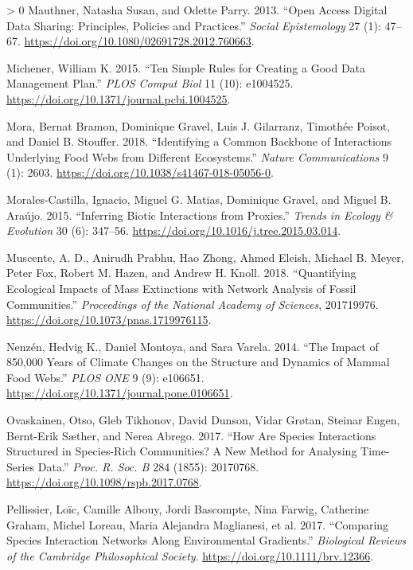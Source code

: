 \documentclass[10pt,oneside]{article}
\newlength{\cslhangindent}
\newenvironment{CSLReferences}[3] %
 {%
  \setlength{\parindent}{0pt}
  \ifodd #1 \everypar{\setlength{\hangindent}{\cslhangindent}}\ignorespaces\fi
  \ifnum #2 > 0
  \setlength{\parskip}{#2\baselineskip}
  \fi
 }%
 {}
\begin{document}
\begin{CSLReferences}{1}{0}
\leavevmode\hypertarget{ref-Mauthner2013OpeAcc}{}%
Mauthner, Natasha Susan, and Odette Parry. 2013. {``Open Access Digital
Data Sharing: Principles, Policies and Practices.''} \emph{Social
Epistemology} 27 (1): 47--67.
\url{https://doi.org/10.1080/02691728.2012.760663}.

\leavevmode\hypertarget{ref-Michener2015TenSim}{}%
Michener, William K. 2015. {``Ten Simple Rules for Creating a Good Data
Management Plan.''} \emph{PLOS Comput Biol} 11 (10): e1004525.
\url{https://doi.org/10.1371/journal.pcbi.1004525}.

\leavevmode\hypertarget{ref-Mora2018IdeCom}{}%
Mora, Bernat Bramon, Dominique Gravel, Luis J. Gilarranz, Timothée
Poisot, and Daniel B. Stouffer. 2018. {``Identifying a Common Backbone
of Interactions Underlying Food Webs from Different Ecosystems.''}
\emph{Nature Communications} 9 (1): 2603.
\url{https://doi.org/10.1038/s41467-018-05056-0}.

\leavevmode\hypertarget{ref-Morales-Castilla2015InfBio}{}%
Morales-Castilla, Ignacio, Miguel G. Matias, Dominique Gravel, and
Miguel B. Araújo. 2015. {``Inferring Biotic Interactions from
Proxies.''} \emph{Trends in Ecology \& Evolution} 30 (6): 347--56.
\url{https://doi.org/10.1016/j.tree.2015.03.014}.

\leavevmode\hypertarget{ref-Muscente2018QuaEco}{}%
Muscente, A. D., Anirudh Prabhu, Hao Zhong, Ahmed Eleish, Michael B.
Meyer, Peter Fox, Robert M. Hazen, and Andrew H. Knoll. 2018.
{``Quantifying Ecological Impacts of Mass Extinctions with Network
Analysis of Fossil Communities.''} \emph{Proceedings of the National
Academy of Sciences}, 201719976.
\url{https://doi.org/10.1073/pnas.1719976115}.

\leavevmode\hypertarget{ref-Nenzen2014Imp850}{}%
Nenzén, Hedvig K., Daniel Montoya, and Sara Varela. 2014. {``The Impact
of 850,000 Years of Climate Changes on the Structure and Dynamics of
Mammal Food Webs.''} \emph{PLOS ONE} 9 (9): e106651.
\url{https://doi.org/10.1371/journal.pone.0106651}.

\leavevmode\hypertarget{ref-Ovaskainen2017HowAre}{}%
Ovaskainen, Otso, Gleb Tikhonov, David Dunson, Vidar Grøtan, Steinar
Engen, Bernt-Erik Sæther, and Nerea Abrego. 2017. {``How Are Species
Interactions Structured in Species-Rich Communities? A New Method for
Analysing Time-Series Data.''} \emph{Proc. R. Soc. B} 284 (1855):
20170768. \url{https://doi.org/10.1098/rspb.2017.0768}.

\leavevmode\hypertarget{ref-Pellissier2017ComSpe}{}%
Pellissier, Loïc, Camille Albouy, Jordi Bascompte, Nina Farwig,
Catherine Graham, Michel Loreau, Maria Alejandra Maglianesi, et al.
2017. {``Comparing Species Interaction Networks Along Environmental
Gradients.''} \emph{Biological Reviews of the Cambridge Philosophical
Society}. \url{https://doi.org/10.1111/brv.12366}.


\end{CSLReferences}
\end{document}
